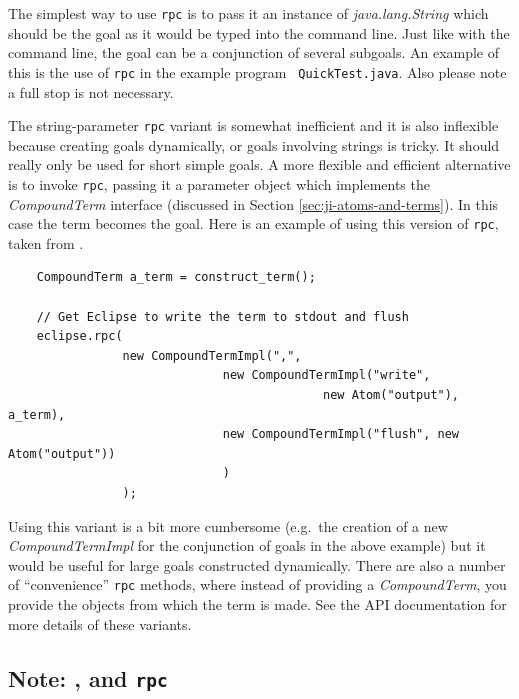 The simplest way to use {\tt rpc} is to pass it an instance of {\it
java.lang.String} which should be the goal as it would be typed into
the {\eclipse} command line. Just like with the {\eclipse} command line,
the goal can be a conjunction of several subgoals. An example of this
is the use of {\tt rpc} in the example program {\tt
QuickTest.java}. Also please note a full stop is not necessary.

The string-parameter {\tt rpc} variant is somewhat inefficient and it
is also inflexible because creating goals dynamically, or goals
involving strings is tricky. It should really only be used for short
simple goals. A more flexible and efficient alternative is to invoke
{\tt rpc}, passing it a parameter object which implements the {\it
CompoundTerm} interface (discussed in Section
\ref{sec:ji-atoms-and-terms}). In this case the term becomes the
goal. Here is an example of using this version of {\tt rpc}, taken
from
.

\begin{verbatim}
    CompoundTerm a_term = construct_term();

    // Get Eclipse to write the term to stdout and flush 
    eclipse.rpc(
                new CompoundTermImpl(",",
                              new CompoundTermImpl("write", 
                                            new Atom("output"), a_term),
                              new CompoundTermImpl("flush", new Atom("output"))
                              )
                );
\end{verbatim}
Using this variant is a bit more cumbersome (e.g.\ the creation of a
new {\it CompoundTermImpl} for the conjunction of goals in the above
example) but it would be useful for large goals constructed
dynamically. There are also a number of ``convenience'' {\tt rpc}
methods, where instead of providing a {\it CompoundTerm}, you provide
the objects from which the term is made. See the API documentation for
more details of these variants.

\subsection*{Note: ,  and {\tt rpc}}

